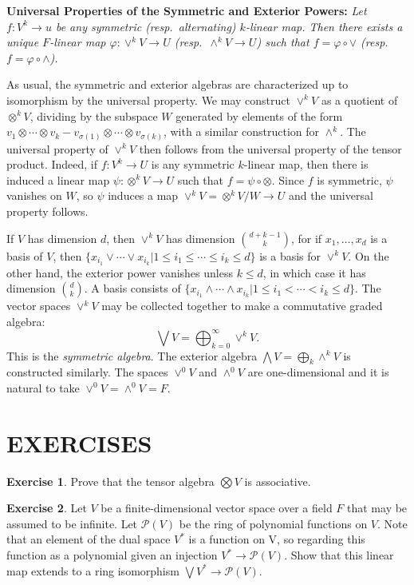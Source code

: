 \documentclass[12pt,reqno]{book}%
\theoremstyle{definition}
\newtheorem{exercise}{Exercise}[chapter]
\theoremstyle{remark}
\theoremstyle{theorem}
\theoremstyle{remark}
\begin{document}
\textbf{Universal Properties of the Symmetric and Exterior Powers:} \textit{Let $f : V^k \to u$ be any symmetric (resp.\ alternating) $k$-linear map.
    Then there exists a unique $F$-linear map $\varphi : \vee^k V \to U$ (resp.\ $\wedge^kV \to U$) such that $f = \varphi \circ \vee$ (resp.\ $f = \varphi \circ \wedge$).}

As usual, the symmetric and exterior algebras are characterized up to isomorphism by the universal property.
We may construct $\vee^kV$ as a quotient of $\otimes^kV$, dividing by the subspace $W$ generated by elements of the form $v_1 \otimes \cdots \otimes v_k - v_{\sigma(1)} \otimes \cdots \otimes v_{\sigma(k)}$, with a similar construction for $\wedge^k$.
The universal property of $\vee^kV$ then follows from the universal property of the tensor product.
Indeed, if $f : V^k \to U$ is any symmetric $k$-linear map, then there is induced a linear map $\psi : \otimes^kV \to U$ such that $f = \psi \circ \otimes$.
Since $f$ is symmetric, $\psi$ vanishes on $W$, so $\psi$ induces a map $\vee^kV = \otimes^kV/W \to U$ and the universal property follows.

If $V$ has dimension $d$, then $\vee^kV$ has dimension ${d + k - 1 \choose k}$, for if $x_1, \ldots, x_d$ is a basis of $V$, then $\{x_{i_1} \vee \cdots \vee x_{i_k} | 1 \leq i_1 \leq \cdots \leq i_k \leq d\}$ is a basis for $\vee^kV$.
On the other hand, the exterior power vanishes unless $k \leq d$, in which case it has dimension $d \choose k$.
A basis consists of $\{x_{i_1} \wedge \cdots \wedge x_{i_k} | 1 \leq i_1 < \cdots < i_k \leq d\}$.
The vector spaces $\vee^kV$ may be collected together to make a commutative graded algebra:
\[
    \bigvee V = \bigoplus_{k = 0}^{\infty} \vee^k V.
\]
This is the \emph{symmetric algebra}.
The exterior algebra $\bigwedge V = \bigoplus_k \wedge^kV$ is constructed similarly.
The spaces $\vee^0V$ and $\wedge^0V$ are one-dimensional and it is natural to take $\vee^0V = \wedge^0V = F$.

\section*{EXERCISES}%
\begin{exercise}\label{}
    Prove that the tensor algebra $\bigotimes V$ is associative.
\end{exercise}

\begin{exercise}\label{}
    Let $V$ be a finite-dimensional vector space over a field $F$ that may be assumed to be infinite.
    Let $\mathcal{P}(V)$ be the ring of polynomial functions on $V$.
    Note that an element of the dual space $V^*$ is a function on V, so regarding this function as a polynomial given an injection $V^* \to \mathcal{P}(V).$
    Show that this linear map extends to a ring isomorphism $\bigvee V^* \to \mathcal{P}(V)$.
\end{exercise}
\end{document}
